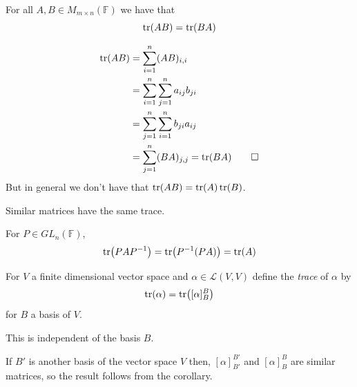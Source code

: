 \documentclass{article}
\newcommand{\F}{\mathbb{F}}
\begin{document}
\begin{lemma}
	For all $ A,B\in M_{m\times n}(\F) $ we have that
	\[
	  \tr(AB)=\tr(BA)
	\]
\end{lemma}
\pf 
\begin{align*}
	\tr(AB)&=\sum_{i=1}^n (AB)_{i,i}\\
	&= \sum_{i=1}^n\sum_{j=1}^na_{ij}b_{ji}\\
	&= \sum_{j=1}^n\sum_{i=1}^nb_{ji}a_{ij}\\
	&= \sum_{j=1}^n(BA)_{j,j}=\tr(BA)\qed
\end{align*}
But in general we don't have that $ \tr(AB)=\tr(A)\tr(B) $.
\begin{corollary}
  Similar matrices have the same trace.
\end{corollary}
\pf For $ P\in GL_n(\F) $,
\[
  \tr(PA{P}^{-1})=\tr({P}^{-1}(PA))=\tr(A)
\]
\begin{definition}
	For $ V $ a finite dimensional vector space and $ \alpha\in\mathcal L(V,V) $ define the \textit{trace} of $ \alpha $ by
	\[
		\tr(\alpha)=\tr([\alpha]_B^B)
	\]
	for $ B $ a basis of $ V $.
\end{definition}
\begin{proposition}
  This is independent of the basis $ B $.
\end{proposition}
\pf If $ B' $ is another basis of the vector space $ V $ then, $ [\alpha]_{B'}^{B'} $ and $ [\alpha]_B^B $ are similar matrices, so the result follows from the corollary.
\end{document}
